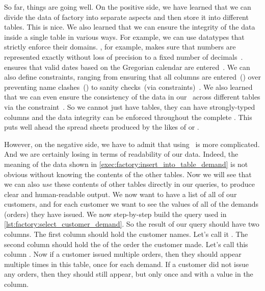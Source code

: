 %
%
%
So far, things are going well.
On the positive side, we have learned that we can divide the data of factory into separate aspects and then store it into different tables.
This is nice.
We also learned that we can ensure the integrity of the data inside a single table in various ways.
For example, we can use datatypes that strictly enforce their domains.
, for example, makes sure that numbers are represented exactly without loss of precision to a fixed number of decimals~\cite{PGDG:PD:NT}.
 ensures that valid dates based on the Gregorian calendar are entered~\cite{PGDG:PD:HU,G1582IG}.
We can also define constraints, ranging from ensuring that all columns are entered~() over preventing name clashes~() to sanity checks~(via  constraints)~\cite{PGDG:PD:C}.
We also learned that we can even ensure the consistency of the data in our \db\ across different tables via the  constraint~\cite{PGDG:PD:FK}.
So we cannot just have tables, they can have strongly-typed columns and the data integrity can be enforced throughout the complete \db.
This puts  well ahead the spread sheets produced by the likes of  or .

However, on the negative side, we have to admit that using \dbs\ is more complicated.
And we are certainly losing in terms of readability of our data.
Indeed, the meaning of the  data shown in \cref{exec:factory:insert_into_table_demand} is not obvious without knowing the contents of the other tables.
Now we will see that we can also \emph{use} these contents of other tables directly in our queries, to produce clear and human-readable output.%
%
%
%
%
We now want to have a list of all of our customers, and for each customer we want to see the  values of all of the demands (orders) they have issued.
We now step-by-step build the query used in \cref{lst:factory:select_customer_demand}.
So the result of our query should have two columns.
The first column should hold the customer names.
Let's call it .
The second column should hold the  of the order the customer made.
Let's call this column .
Now if a customer issued multiple orders, then they should appear multiple times in this table, once for each demand.
If a customer did not issue any orders, then they should still appear, but only once and with a  value in the  column.

